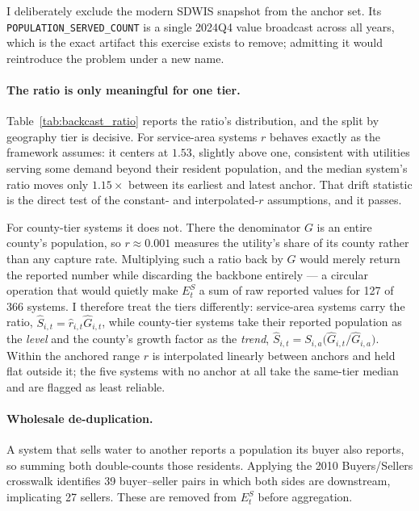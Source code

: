 I deliberately exclude the modern SDWIS snapshot from the anchor set. Its
\texttt{POPULATION\_SERVED\_COUNT} is a single 2024Q4 value broadcast across all
years, which is the exact artifact this exercise exists to remove; admitting it
would reintroduce the problem under a new name.



\paragraph{The ratio is only meaningful for one tier.}
Table~\ref{tab:backcast_ratio} reports the ratio's distribution, and the split by
geography tier is decisive. For service-area systems $r$ behaves exactly as the
framework assumes: it centers at $1.53$, slightly above one, consistent with
utilities serving some demand beyond their resident population, and the median
system's ratio moves only $1.15\times$ between its earliest and latest anchor.
That drift statistic is the direct test of the constant- and interpolated-$r$
assumptions, and it passes.

For county-tier systems it does not. There the denominator $G$ is an entire
county's population, so $r\approx 0.001$ measures the utility's share of its
county rather than any capture rate. Multiplying such a ratio back by $G$ would
merely return the reported number while discarding the backbone entirely --- a
circular operation that would quietly make $E^{S}_t$ a sum of raw reported values
for 127 of 366 systems. I therefore treat the tiers differently: service-area
systems carry the ratio, $\hat S_{i,t}=\hat r_{i,t}\hat G_{i,t}$, while
county-tier systems take their reported population as the \emph{level} and the
county's growth factor as the \emph{trend},
$\hat S_{i,t}=S_{i,a}\bigl(\hat G_{i,t}/\hat G_{i,a}\bigr)$. Within the anchored
range $r$ is interpolated linearly between anchors and held flat outside it; the
five systems with no anchor at all take the same-tier median and are flagged as
least reliable.



\paragraph{Wholesale de-duplication.}
A system that sells water to another reports a population its buyer also reports,
so summing both double-counts those residents. Applying the 2010 Buyers/Sellers
crosswalk identifies 39 buyer--seller pairs in which both sides are downstream,
implicating 27 sellers. These are removed from $E^{S}_t$ before aggregation.

